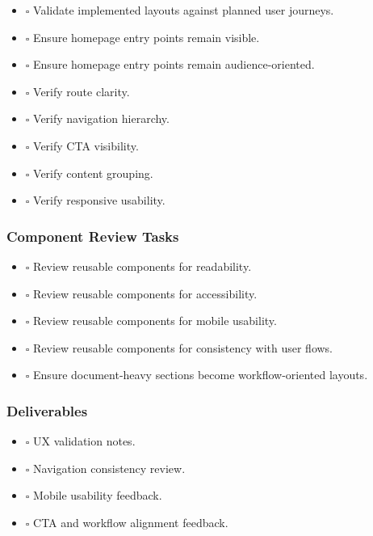 \documentclass[12pt,a4paper]{article}
\providecommand{\tightlist}{\setlength{\itemsep}{0pt}\setlength{\parskip}{0pt}}
\begin{document}
\begin{itemize}
\tightlist
\item
  \(\square\) Validate implemented layouts against planned user journeys.
\item
  \(\square\) Ensure homepage entry points remain visible.
\item
  \(\square\) Ensure homepage entry points remain audience-oriented.
\item
  \(\square\) Verify route clarity.
\item
  \(\square\) Verify navigation hierarchy.
\item
  \(\square\) Verify CTA visibility.
\item
  \(\square\) Verify content grouping.
\item
  \(\square\) Verify responsive usability.
\end{itemize}

\subsubsection{Component Review Tasks}\label{component-review-tasks}

\begin{itemize}
\tightlist
\item
  \(\square\) Review reusable components for readability.
\item
  \(\square\) Review reusable components for accessibility.
\item
  \(\square\) Review reusable components for mobile usability.
\item
  \(\square\) Review reusable components for consistency with user flows.
\item
  \(\square\) Ensure document-heavy sections become workflow-oriented layouts.
\end{itemize}

\subsubsection{Deliverables}\label{deliverables-1}

\begin{itemize}
\tightlist
\item
  \(\square\) UX validation notes.
\item
  \(\square\) Navigation consistency review.
\item
  \(\square\) Mobile usability feedback.
\item
  \(\square\) CTA and workflow alignment feedback.
\end{itemize}
\end{document}
